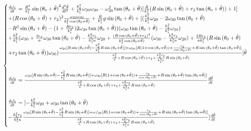 \begin{equation}
  \begin{cases}
    \frac{d\Tilde{\omega_1}}{dt}=\frac{R^2}{k_1^2}\sin{(\theta_0+\Tilde{\theta})}^2\frac{d^2\Tilde{\theta}}{dt^2}+\frac{k_2^2}{k_1^2}\omega_{20}\omega_{30}-\omega_{30}^2\tan{(\theta_0+\Tilde{\theta})}[\frac{R}{k_1^2}(R\sin{(\theta_0+\Tilde{\theta})}+r_2\tan{(\theta_0+\Tilde{\theta})})+1]\\
    +(R\cos{(\theta_0+\Tilde{\theta})}+r_2)^2\frac{\omega_{20}\omega_{30}}{k_1^2 \cos{(\theta_0+\Tilde{\theta})}}+\frac{R}{k_1^2}g \sin{(\theta_0+\Tilde{\theta})}+[(\frac{k_2^2}{k_1^2}\omega_{20}-2\omega_{30}\tan{(\theta_0+\Tilde{\theta})}\\
    -R^2\sin{(\theta_0+\Tilde{\theta})}-(1+\frac{R r_2}{k_1^2})2\omega_{30}\tan{(\theta_0+\Tilde{\theta})})(\omega_{30}\tan{(\theta_0+\Tilde{\theta})}-\frac{k_2^2}{k_1^2}\omega_{20})\\
    +\frac{k_2^2}{k_1^2}(\omega_{30}+\frac{2r_2}{a}\omega_{30} \tan{(\theta_0+\Tilde{\theta})}-\frac{k_2^2 r_2}{k_1^2 a}\omega_{20}+\frac{(R\cos{(\theta_0+\Tilde{\theta})}+r_2)^2}{k_2^2\cos{(\theta_0+\Tilde{\theta})}}(\omega_{30}-\frac{k_2^2 r_2}{k_1^2 a}\omega_{20})+\frac{2R r_2}{a k_1^2}(R\sin{(\theta_0+\Tilde{\theta})}\\
    +r_2 \tan{(\theta_0+\Tilde{\theta})})\omega_{30})\frac{\omega_{20}[R\sin{(\theta_0+\Tilde{\theta})}-\frac{k_2^2}{k_1^2}R\sin{(\theta_0+\Tilde{\theta})}]+\omega_{30}[R(1+\cos{(\theta_0+\Tilde{\theta})})+\frac{r_2}{\cos{(\theta_0+\Tilde{\theta})}}+R\sin{(\theta_0+\Tilde{\theta})}\tan{(\theta_0+\Tilde{\theta})}]}{\frac{k_2^2}{a}+R\cos{(\theta_0+\Tilde{\theta})}+r_2+\frac{k_2^2 r_2}{k_1^2 a}R\sin{(\theta_0+\Tilde{\theta})}}]\Tilde{\theta} \\
    \\
    
    \frac{d\Tilde{\omega_2}}{dt}=\frac{\omega_{20}[R\sin{(\theta_0+\Tilde{\theta})}-\frac{k_2^2}{k_1^2}R\sin{(\theta_0+\Tilde{\theta})}]+\omega_{30}[R(1+\cos{(\theta_0+\Tilde{\theta})})+\frac{r_2}{\cos{(\theta_0+\Tilde{\theta})}}+R\sin{(\theta_0+\Tilde{\theta})}\tan{(\theta_0+\Tilde{\theta})}]}{\frac{k_2^2}{a}+R\cos{(\theta_0+\Tilde{\theta})}+r_2+\frac{k_2^2 r_2}{k_1^2 a}R\sin{(\theta_0+\Tilde{\theta})}} \frac{d\Tilde{\theta}}{dt}\\
    \\
    
    \frac{d\Tilde{\omega_3}}{dt}=[-\frac{k_2^2}{k_1^2}\omega_{20}+\omega_{30}\tan{(\theta_0+\Tilde{\theta})}\\
    -\frac{k_2^2 r_2}{k_1^2 a}\frac{\omega_{20}[R\sin{(\theta_0+\Tilde{\theta})}-\frac{k_2^2}{k_1^2}R\sin{(\theta_0+\Tilde{\theta})}]+\omega/_{30}[R(1+\cos{(\theta_0+\Tilde{\theta})})+\frac{r_2}{\cos{(\theta_0+\Tilde{\theta})}}+R\sin{(\theta_0+\Tilde{\theta})}\tan{(\theta_0+\Tilde{\theta})}]}{\frac{k_2^2}{a}+R\cos{(\theta_0+\Tilde{\theta})}+r_2+\frac{k_2^2 r_2}{k_1^2 a}R\sin{(\theta_0+\Tilde{\theta})}}]\frac{d\Tilde{\theta}}{dt}
  \end{cases}
  \label{eq:b22}
\end{equation}

